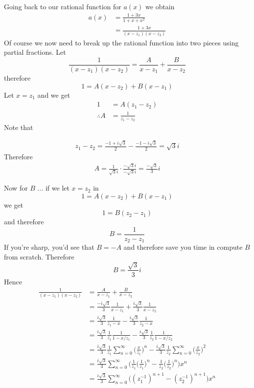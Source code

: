 Going back to our rational function for $a(x)$ we obtain
\begin{align*}
a(x) 
&= \frac{1 + 3x}{1 + x + x^2} \\
&= \frac{1 + 3x}{(x - z_1)(x - z_2)}
\end{align*}
Of course we now need to break up the rational function into two pieces using
partial fractions.
Let
\[
\frac{1}{(x - z_1)(x - z_2)} 
= 
\frac{A}{x - z_1}
+
\frac{B}{x - z_2}
\]
therefore
\[
1 
= 
A(x - z_2)
+
B(x - z_1)
\]
Let $x = z_1$ and we get
\begin{align*}
1 
&= A(z_1 - z_2) \\
\therefore
A &= \frac{1}{z_1 - z_2}
\end{align*}
Note that


\begin{align*}
z_1 - z_2 
= \frac{-1 + i\sqrt{3}}{2} - \frac{-1 - i\sqrt{3}}{2}
= \sqrt{3}i
\end{align*}
Therefore
\begin{align*}
A 
= \frac{1}{\sqrt{3}i} \cdot \frac{-\sqrt{3}i}{-\sqrt{3}i}
= \frac{-\sqrt{3}}{3} i
\end{align*}

Now for $B$ ... if we let $x = z_2$ in 
\[
1 
= 
A(x - z_2)
+
B(x - z_1)
\]
we get
\[
1 = B(z_2 - z_1)
\]
and therefore
\[
B = \frac{1}{z_2 - z_1}
\]
If you're sharp, you'd see that $B = -A$ and therefore save you time in compute $B$ from scratch.
Therefore
\[
B = \frac{\sqrt{3}}{3} i
\]
Hence
\begin{align*}
\frac{1}{(x - z_1)(x - z_2)} 
&= \frac{A}{x - z_1} + \frac{B}{x - z_2} \\
&= \frac{-i\sqrt{3}}{3} \frac{1}{x - z_1} + \frac{i\sqrt{3}}{3} \frac{1}{x - z_2} \\
&= \frac{i\sqrt{3}}{3} \frac{1}{z_1 - x} - \frac{i\sqrt{3}}{3} \frac{1}{z_2 - x} \\
&= \frac{i\sqrt{3}}{3} \frac{1}{z_1} \frac{1}{1 - x/z_1} - \frac{i\sqrt{3}}{3} \frac{1}{z_2} \frac{1}{1 - x/z_2} \\
&= \frac{i\sqrt{3}}{3} \frac{1}{z_1} \sum_{n=0}^\infty \biggl( \frac{x}{z_1} \biggr)^n  
- \frac{i\sqrt{3}}{3} \frac{1}{z_2} \sum_{n=0}^\infty \biggl( \frac{x}{z_2} \biggr)^2 \\
&=  
\frac{i\sqrt{3}}{3}
\sum_{n=0}^\infty 
\biggl( 
\frac{1}{z_1} \biggl( \frac{1}{z_1} \biggr)^n  
-  \frac{1}{z_2} \biggl( \frac{1}{z_2} 
\biggr)^n\biggr) 
x^n\\
&=  
\frac{i\sqrt{3}}{3}
\sum_{n=0}^\infty 
\biggl( 
(z_1^{-1})^{n+1}  
-  (z_2^{-1})^{n+1} 
\biggr) 
x^n
\end{align*}

